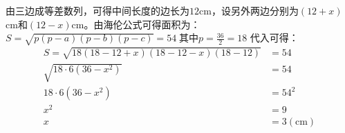 \documentclass[answers]{exam}
\begin{document}
\begin{questions}
\begin{solution}

		由三边成等差数列，可得中间长度的边长为$12$cm，设另外两边分别为$(12+x)$cm和$(12-x)$cm。由海伦公式可得面积为：
		\begin{math}
			S = \sqrt{p(p-a)(p-b)(p-c)} = 54\; \text{其中} p = \frac{36}{2} = 18
		\end{math}
		代入可得：
		\begin{align*}
			S = \sqrt{18(18 - 12 + x)(18 - 12 - x)(18 - 12)} & = 54              \\
			\sqrt{18\cdot 6 (36-x^2)}                        & = 54              \\
			18\cdot 6 (36- x^2)                              & = 54^2            \\
			x^2                                              & = 9               \\
			x                                                & = 3 (\mathrm{cm})
		\end{align*}

	\end{solution}

\end{questions}
\end{document}
